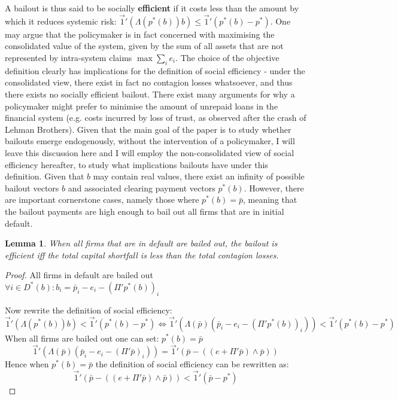 \documentclass[12pt,a4paper]{article}
\newtheorem{lemma}{Lemma}
\begin{document}
A bailout is thus said to be socially \textbf{efficient} if it costs less than the amount by which it reduces systemic risk: $\vec{1}' (\Lambda (p^* (b))b) \le \vec{1}' (p^* (b)-p^* )$. One may argue that the policymaker is in fact concerned with maximising the consolidated value of the system, given by the sum of all assets that are not represented by intra-system claims $\max \sum_{i}e_i$. The choice of the objective definition clearly has implications for the definition of social efficiency - under the consolidated view, there exist in fact no contagion losses whatsoever, and thus there exists no socially efficient bailout. There exist many arguments for why a policymaker might prefer to minimise the amount of unrepaid loans in the financial system (e.g. costs incurred by loss of trust, as observed after the crash of Lehman Brothers). Given that the main goal of the paper is to study whether bailouts emerge endogenously, without the intervention of a policymaker, I will leave this discussion here and I will employ the non-consolidated view of social efficiency hereafter, to study what implications bailouts have under this definition.
Given that $b$ may contain real values, there exist an infinity of possible bailout vectors $b$ and associated clearing payment vectors $p^*(b)$. However, there are important cornerstone cases, namely those where $p^*(b) = \bar{p}$, meaning that the bailout payments are high enough to bail out all firms that are in initial default.

\begin{lemma} \label{lem:efficientbailout}
When all firms that are in default are bailed out, the bailout is efficient iff the total capital shortfall is less than the total contagion losses.
\end{lemma}

\begin{proof}
All firms in default are bailed out $\forall i \in D^* (b) \colon b_i=\bar{p}_i-e_i-(\Pi' p^* (b))_i$

Now rewrite the definition of social efficiency:
\[
\vec{1}' (\Lambda(p^* (b))b) < \vec{1}' (p^* (b)-p^* ) \Leftrightarrow
\vec{1}' (\Lambda(\bar{p})(\bar{p}_i-e_i-(\Pi' p^* (b))_i )) < \vec{1}' (p^* (b)-p^* )
\]
When all firms are bailed out one can set: $p^* (b)=\bar{p}$
\[
\vec{1}' (\Lambda(\bar{p})(\bar{p}_i-e_i-(\Pi' \bar{p})_i ))= \vec{1}' (\bar{p}-((e+\Pi' \bar{p}) \wedge \bar{p}))
\]
Hence when $p^* (b)=\bar{p}$ the definition of social efficiency can be rewritten as:
\[
\vec{1}' (\bar{p}-((e+\Pi' \bar{p}) \wedge \bar{p})) < \vec{1}' (\bar{p}-p^* )
\]
\end{proof}
\end{document}
